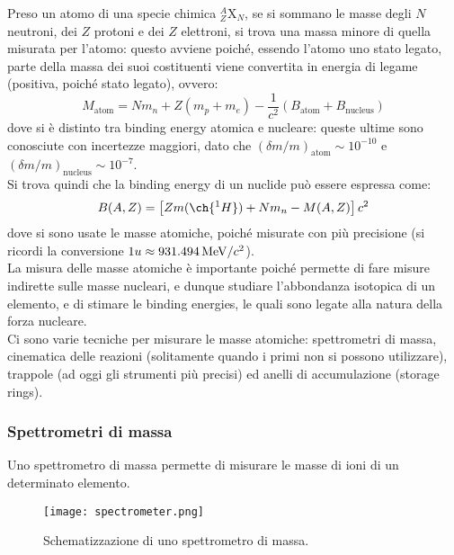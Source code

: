 Preso un atomo di una specie chimica $ ^A_Z \text{X}_N $, se si sommano le masse degli $ N $ neutroni, dei $ Z $ protoni e dei $ Z $ elettroni, si trova una massa minore di quella misurata per l'atomo: questo avviene poiché, essendo l'atomo uno stato legato, parte della massa dei suoi costituenti viene convertita in energia di legame (positiva, poiché stato legato), ovvero:
\begin{equation}
	M_{\text{atom}} = N m_n + Z \left( m_p + m_e \right) - \frac{1}{c^2} \left( B_{\text{atom}} + B_{\text{nucleus}} \right)
	\label{eq:1.17}
\end{equation}
dove si è distinto tra binding energy atomica e nucleare: queste ultime sono conosciute con incertezze maggiori, dato che $ (\delta m / m)_{\text{atom}} \sim 10^{-10} $ e $ (\delta m / m)_{\text{nucleus}} \sim 10^{-7} $.\\
Si trova quindi che la binding energy di un nuclide può essere espressa come:
\begin{equation}
	B(A,Z) = \left[ Z m({\ch{^{1}H}}) + N m_n - M(A,Z) \right] c^2
	\label{eq:1.18}
\end{equation}
dove si sono usate le masse atomiche, poiché misurate con più precisione (si ricordi la conversione $ 1u \approx 931.494\,\mathrm{MeV}/c^2 $).\\
La misura delle masse atomiche è importante poiché permette di fare misure indirette sulle masse nucleari, e dunque studiare l'abbondanza isotopica di un elemento, e di stimare le binding energies, le quali sono legate alla natura della forza nucleare.\\
Ci sono varie tecniche per misurare le masse atomiche: spettrometri di massa, cinematica delle reazioni (solitamente quando i primi non si possono utilizzare), trappole (ad oggi gli strumenti più precisi) ed anelli di accumulazione (storage rings).

\subsubsection{Spettrometri di massa}

Uno spettrometro di massa permette di misurare le masse di ioni di un determinato elemento.
\begin{figure}[!b]
	\centering
	\texttt{[image: spectrometer.png]}
	\caption{Schematizzazione di uno spettrometro di massa.}
	\label{spettr}
\end{figure}

